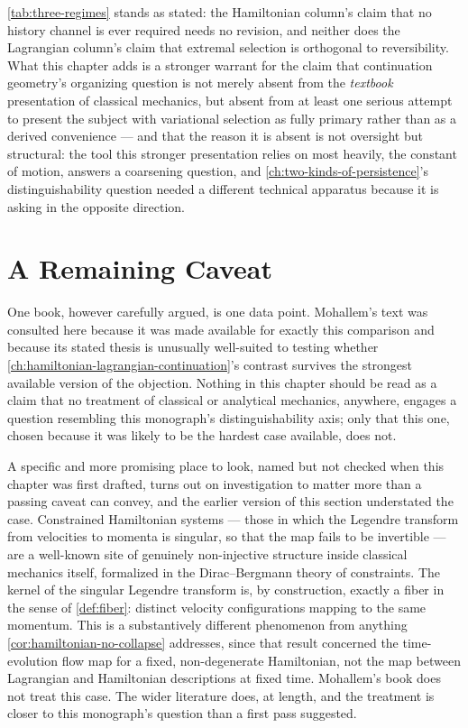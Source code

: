 \documentclass[11pt]{book}
\theoremstyle{plain}
\theoremstyle{definition}
\theoremstyle{remark}
\begin{document}
\cref{tab:three-regimes} stands as stated: the Hamiltonian column's
claim that no history channel is ever required needs no revision, and
neither does the Lagrangian column's claim that extremal selection is
orthogonal to reversibility. What this chapter adds is a stronger
warrant for the claim that continuation geometry's organizing question
is not merely absent from the \emph{textbook} presentation of
classical mechanics, but absent from at least one serious attempt to
present the subject with variational selection as fully primary rather
than as a derived convenience --- and that the reason it is absent is
not oversight but structural: the tool this stronger presentation
relies on most heavily, the constant of motion, answers a
coarsening question, and \cref{ch:two-kinds-of-persistence}'s
distinguishability question needed a different technical apparatus
because it is asking in the opposite direction.

\section{A Remaining Caveat}

One book, however carefully argued, is one data point. Mohallem's text
was consulted here because it was made available for exactly this
comparison and because its stated thesis is unusually well-suited to
testing whether \cref{ch:hamiltonian-lagrangian-continuation}'s
contrast survives the strongest available version of the objection.
Nothing in this chapter should be read as a claim that no treatment of
classical or analytical mechanics, anywhere, engages a question
resembling this monograph's distinguishability axis; only that this
one, chosen because it was likely to be the hardest case available,
does not.

A specific and more promising place to look, named but not checked
when this chapter was first drafted, turns out on investigation to
matter more than a passing caveat can convey, and the earlier version
of this section understated the case. Constrained Hamiltonian systems
--- those in which the Legendre transform from velocities to momenta
is singular, so that the map fails to be invertible --- are a
well-known site of genuinely non-injective structure inside classical
mechanics itself, formalized in the Dirac--Bergmann theory of
constraints. The kernel of the singular Legendre transform is, by
construction, exactly a fiber in the sense of \cref{def:fiber}: distinct
velocity configurations mapping to the same momentum. This is a
substantively different phenomenon from anything
\cref{cor:hamiltonian-no-collapse} addresses, since that result
concerned the time-evolution flow map for a fixed, non-degenerate
Hamiltonian, not the map between Lagrangian and Hamiltonian
descriptions at fixed time. Mohallem's book does not treat this case.
The wider literature does, at length, and the treatment is closer to
this monograph's question than a first pass suggested.
\end{document}
